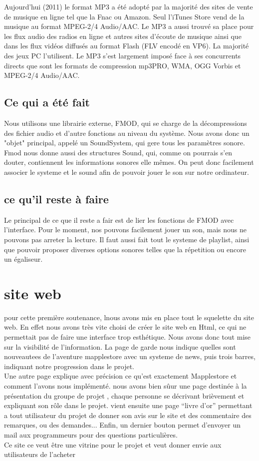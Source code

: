 \documentclass{report}
\begin{document}
Aujourd'hui (2011) le format MP3 a été adopté par la majorité des sites de vente de musique en ligne tel que la Fnac ou Amazon. Seul l'iTunes Store vend de la musique au format MPEG-2/4 Audio/AAC. Le MP3 a aussi trouvé sa place pour les flux audio des radios en ligne et autres sites d'écoute de musique ainsi que dans les flux vidéos diffusés au format Flash (FLV encodé en VP6). La majorité des jeux PC l'utilisent. Le MP3 s'est largement imposé face à ses concurrents directs que sont les formats de compression mp3PRO, WMA, OGG Vorbis et MPEG-2/4 Audio/AAC.

\section{Ce qui a été fait}
Nous utilisons une librairie externe, FMOD, qui se charge de la décompressions des fichier audio et d'autre fonctions au niveau du système. Nous avons donc un "objet" principal, appelé un SoundSystem, qui gere tous les paramètres sonore. Fmod nous donne aussi des structures Sound, qui, comme on pourrais s'en douter, contiennent les informations sonores elle mêmes. On peut donc facilement associer le systeme et le sound afin de pouvoir jouer le son sur notre ordinateur.

\section{ce qu'il reste à faire}
Le principal de ce que il reste a fair est de lier les fonctions de FMOD avec l'interface. Pour le moment, nos pouvons facilement jouer un son, mais nous ne pouvons pas arreter la lecture. Il faut aussi fait tout le systeme de playlist, ainsi que pouvoir proposer diverses options sonores telles que la répetition ou encore un égaliseur.

\chapter{site web}

pour cette première soutenance, lnous avons mis en place tout le squelette du site web. En effet nous avons très vite choisi de créer le site web en Html, ce qui ne permettait pas de faire une interface trop esthétique. Nous avons donc tout mise sur la visibilité de l'information. La page de garde nous indique quelles sont nouveautees de l'aventure mapplestore avec un systeme de news, puis trois barres, indiquant notre progression dans le projet. \\
Une autre page explique avec précision ce qu'est exactement Mapplestore et comment l'avons nous implémenté. nous avons bien sûur une page destinée à la présentation du groupe de projet , chaque personne se décrivant brièvement et expliquant son rôle dans le projet. vient ensuite une page ``livre d'or'' permettant a tout utilisateur du projet de donner son avis sur le site et des commentaire des remarques, ou des demandes... Enfin, un dernier bouton permet d'envoyer un mail aux programmeurs pour des questions particulières.\\
 Ce site ce veut être une vitrine pour le projet et veut donner envie aux utilisateurs de l'acheter
\end{document}
